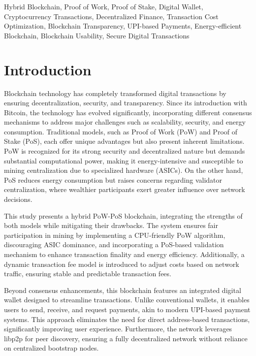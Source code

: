 \documentclass[conference]{IEEEtran}
\begin{document}
\begin{IEEEkeywords}
Hybrid Blockchain, Proof of Work, Proof of Stake, Digital Wallet, Cryptocurrency Transactions, Decentralized Finance, Transaction Cost Optimization, Blockchain Transparency, UPI-based Payments, Energy-efficient Blockchain, Blockchain Usability, Secure Digital Transactions
\end{IEEEkeywords}

\section{Introduction}
Blockchain technology has completely transformed digital transactions by ensuring decentralization, security, and transparency. Since its introduction with Bitcoin, the technology has evolved significantly, incorporating different consensus mechanisms to address major challenges such as scalability, security, and energy consumption. Traditional models, such as Proof of Work (PoW) and Proof of Stake (PoS), each offer unique advantages but also present inherent limitations. PoW is recognized for its strong security and decentralized nature but demands substantial computational power, making it energy-intensive and susceptible to mining centralization due to specialized hardware (ASICs). On the other hand, PoS reduces energy consumption but raises concerns regarding validator centralization, where wealthier participants exert greater influence over network decisions.

This study presents a hybrid PoW-PoS blockchain, integrating the strengths of both models while mitigating their drawbacks. The system ensures fair participation in mining by implementing a CPU-friendly PoW algorithm, discouraging ASIC dominance, and incorporating a PoS-based validation mechanism to enhance transaction finality and energy efficiency. Additionally, a dynamic transaction fee model is introduced to adjust costs based on network traffic, ensuring stable and predictable transaction fees.

Beyond consensus enhancements, this blockchain features an integrated digital wallet designed to streamline transactions. Unlike conventional wallets, it enables users to send, receive, and request payments, akin to modern UPI-based payment systems. This approach eliminates the need for direct address-based transactions, significantly improving user experience. Furthermore, the network leverages libp2p for peer discovery, ensuring a fully decentralized network without reliance on centralized bootstrap nodes.
\end{document}
